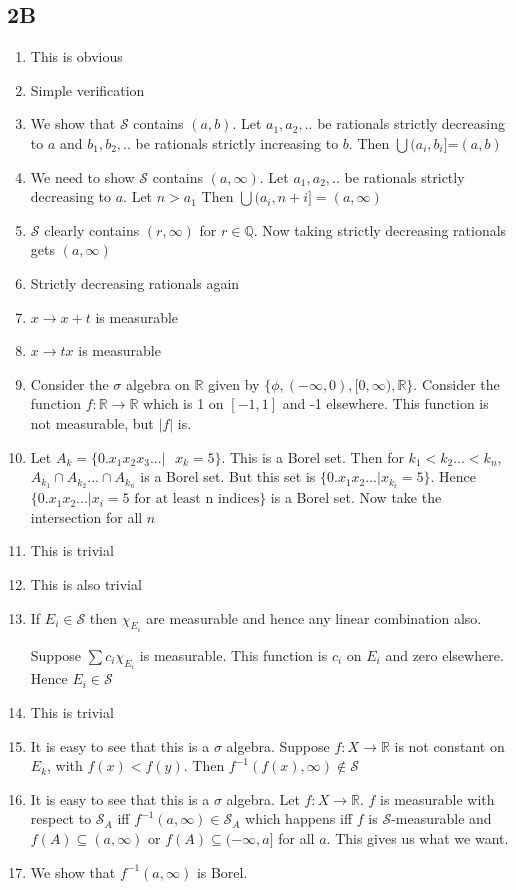 \documentclass{article}
\begin{document}
\subsection*{2B}
\begin{enumerate}
    \item  This is obvious
    \item  Simple verification
    \item  We show that $\mathcal{S}$ contains $(a,b)$. Let $a_1,a_2,..$ be rationals strictly decreasing to $a$ and $b_1,b_2,..$ be rationals strictly increasing to $b$. Then $\bigcup(a_i,b_i]$=$(a,b)$
    \item  We need to show $\mathcal{S}$ contains $(a,\infty)$. Let $a_1,a_2,..$ be rationals strictly decreasing to $a$. Let $n > a_1$ Then $\bigcup (a_i,n+i]=(a,\infty)$
    \item  $\mathcal{S}$ clearly contains $(r,\infty)$ for $r \in \mathbb{Q}$. Now taking strictly decreasing rationals gets $(a,\infty)$
    \item  Strictly decreasing rationals again
    \item  $x \to x+ t$ is measurable
    \item  $x \to tx$ is measurable
    \item [9] Consider the $\sigma$ algebra on $\mathbb{R}$ given by $\{\phi,(-\infty,0),[0,\infty),\mathbb{R}\}$. Consider the function $f:\mathbb{R}\to\mathbb{R}$ which is 1 on $[-1,1]$ and -1 elsewhere. This function is not measurable, but $|f|$ is.
    \item [10] Let $A_k=\{0.x_1x_2x_3... |\text{ } x_k =5\}$. This is a Borel set. Then for $k_1 < k_2 ...<k_n$, $A_{k_1}\cap A_{k_2}... \cap A_{k_n}$ is a Borel set. But this set is $\{0.x_1x_2...|x_{k_i}=5\}$. Hence $\{0.x_1x_2...|x_i=5 \text{ for at least n indices}\}$ is a Borel set. Now take the intersection for all $n$
    \item[11] This is trivial
    \item[12] This is also trivial
    \item[13] If $E_i \in \mathcal{S}$ then $\chi_{E_i}$ are measurable and hence any linear combination also.

    Suppose $\sum c_i\chi_{E_i}$ is measurable. This function is $c_i$ on $E_i$ and zero elsewhere. Hence $E_i \in \mathcal{S}$
    \item[14] This is trivial
    \item[15] It is easy to see that this is a $\sigma$ algebra. Suppose $f:X \to \mathbb{R}$ is not constant on $E_k$, with $f(x) < f(y)$. Then $f^{-1}(f(x),\infty) \notin \mathcal{S}$
    \item[16] It is easy to see that this is a $\sigma$ algebra. Let $f:X\to\mathbb{R}$. $f$ is measurable with respect to $\mathcal{S}_A$ iff $f^{-1}(a,\infty) \in \mathcal{S}_A$ which happens iff $f$ is $\mathcal{S}$-measurable and $f(A)\subseteq(a,\infty)$ or $f(A)\subseteq(-\infty,a]$ for all $a$. This gives us what we want.
    \item[17] We show that $f^{-1}(a,\infty)$ is Borel.


\end{enumerate}
\end{document}
